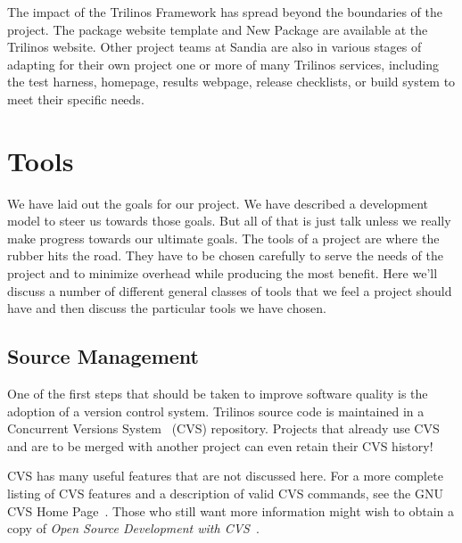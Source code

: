 \documentclass[12pt,relax]{article}
\begin{document}
    The impact of the Trilinos Framework has spread beyond the boundaries of 
    the project.  The package website template and New Package are available 
    at the Trilinos website.  Other project teams at Sandia are also in various
    stages of adapting for their own project one or more of many Trilinos
    services, including the test harness, homepage, results webpage, 
    release checklists, or build system to meet their specific needs.

\clearpage


\section{Tools}
\label{Section:Tools}

We have laid out the goals for our project.  We have described a development
model to steer us towards those goals.  But all of that is just talk unless we
really make progress towards our ultimate goals.  The tools of a project are
where the rubber hits the road.  They have to be chosen carefully to serve the
needs of the project and to minimize overhead while producing the most benefit.
Here we'll discuss a number of different general classes of tools that we feel
a project should have and then discuss the particular tools we have chosen.

\subsection{Source Management}
One of the first steps that should be taken to improve software quality is the 
adoption of a version control system.  Trilinos source code is maintained in a 
Concurrent Versions System~\cite{CVS}
(CVS) repository.  Projects that already use CVS and are to be merged with 
another project can even retain their CVS history!

CVS has many useful features that are not discussed here.  For a more 
complete listing of CVS features and a description of valid CVS commands, 
see the GNU CVS Home Page~\cite{CVS}.  Those who still want more information 
might wish to obtain a copy of 
{\it Open Source Development with CVS}~\cite{FogelBarCVS}.
\end{document}
